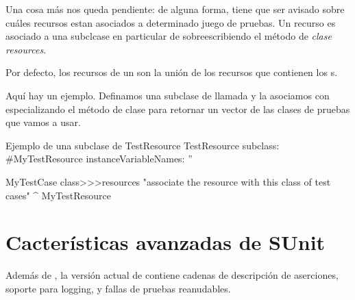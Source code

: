 \documentclass[a4paper,10pt,twoside]{book}
\begin{document}
Una cosa m\'as nos queda pendiente: de alguna forma, \sunit tiene que ser avisado sobre cu\'ales recursos
estan asociados a determinado juego de pruebas.
Un recurso es asociado a una subclcase en particular de  sobreescribiendo el m\'etodo de \emph{clase}
\emph{resources}.


Por defecto, los recursos de un  son la uni\'on de los recursos que contienen los 
s. 

Aqu\'i hay un ejemplo.
Definamos una subclase de  llamada  y la asociamos con 
especializando el m\'etodo de clase  para retornar un vector de las clases de pruebas que vamos 
a usar.

\begin{classdef}[mytestresource]{Ejemplo de una subclase de TestResource}
TestResource subclass: #MyTestResource
	instanceVariableNames: ''

MyTestCase class>>>resources
	"associate the resource with this class of test cases"
	^{ MyTestResource }
\end{classdef}






\section{Cacter\'isticas avanzadas de SUnit}

Adem\'as de , la versi\'on actual de \sunit contiene cadenas de descripci\'on de aserciones,
soporte para logging, y fallas de pruebas reanudables.
\end{document}
